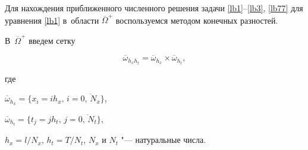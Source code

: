 \smallskip




Для нахождения приближенного численного решения задачи \eqref{lb1}--\eqref{lb3}, \eqref{lb77} для уравнения \eqref{lb1} в~области $\overline{\Omega}^{+}$ воспользуемся методом конечных разностей.

В~$\overline{\Omega}^{+}$ введем сетку 

$$\overline{\omega}_{h_x h_t}=\overline{\omega}_{h_x}  \times \overline{\omega}_{h_t},$$ 

где 

$\overline{\omega}_{h_x}=\{x_i=i h_x,\,i=\overline{0,\,N_x}\}$, 

$\overline{\omega}_{h_t}=\{t_j=j h_t,\,j=\overline{0,\,N_t}\}$, 

$h_x=l/N_x$, $h_t=T/N_t$, $N_x$ и $N_t$ "--- натуральные числа. 






















